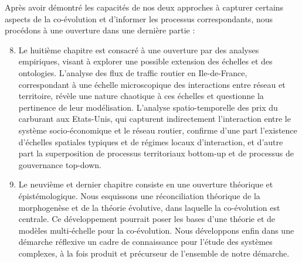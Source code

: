 {\begin{enumerate}
\end{enumerate}
Après avoir démontré les capacités de nos deux approches à capturer certains aspects de la co-évolution et d'informer les processus correspondants, nous procédons à une ouverture dans une dernière partie :
\begin{enumerate}\setcounter{enumi}{7}
	\item Le huitième chapitre est consacré à une ouverture par des analyses empiriques, visant à explorer une possible extension des échelles et des ontologies. L'analyse des flux de traffic routier en Ile-de-France, correspondant à une échelle microscopique des interactions entre réseau et territoire, révèle une nature chaotique à ces échelles et questionne la pertinence de leur modélisation. L'analyse spatio-temporelle des prix du carburant aux Etats-Unis, qui capturent indirectement l'interaction entre le système socio-économique et le réseau routier, confirme d'une part l'existence d'échelles spatiales typiques et de régimes locaux d'interaction, et d'autre part la superposition de processus territoriaux bottom-up et de processus de gouvernance top-down.
	\item Le neuvième et dernier chapitre consiste en une ouverture théorique et épistémologique. Nous esquissons une réconciliation théorique de la morphogenèse et de la théorie évolutive, dans laquelle la co-évolution est centrale. Ce développement pourrait poser les bases d'une théorie et de modèles multi-échelle pour la co-évolution. Nous développons enfin dans une démarche réflexive un cadre de connaissance pour l'étude des systèmes complexes, à la fois produit et précurseur de l'ensemble de notre démarche.
\end{enumerate}
}












